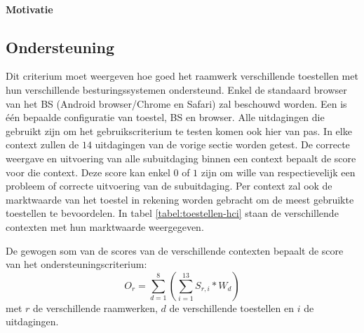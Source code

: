 \paragraph{Motivatie}


\subsection{Ondersteuning}
\label{sec:vergelijking-ondersteuning}
Dit criterium moet weergeven hoe goed het raamwerk verschillende toestellen met hun verschillende besturingssystemen ondersteund.
Enkel de standaard browser van het BS (Android browser/Chrome en Safari) zal beschouwd worden.
Een  is één bepaalde configuratie van toestel, BS en browser.
Alle uitdagingen die gebruikt zijn om het gebruikscriterium te testen komen ook hier van pas.
In elke context zullen de $14$ uitdagingen van de vorige sectie worden getest.
De correcte weergave en uitvoering van alle subuitdaging binnen een context bepaalt de score voor die context.
Deze score kan enkel $0$ of $1$ zijn om wille van respectievelijk een probleem of correcte uitvoering van de subuitdaging.
Per context zal ook de marktwaarde van het toestel in rekening worden gebracht om de meest gebruikte toestellen te bevoordelen.
In tabel \ref{tabel:toestellen-hci} staan de verschillende contexten met hun marktwaarde weergegeven.

De gewogen som van de scores van de verschillende contexten bepaalt de score van het ondersteuningscriterium:
\begin{equation}
  O_r = \sum_{d=1}^{8}{\left(\sum_{i=1}^{13}S_{r,i}*W_d\right)}
  \label{eq:ondersteuning}
\end{equation}
met $r$ de verschillende raamwerken,  $d$ de verschillende toestellen en $i$ de uitdagingen. 


